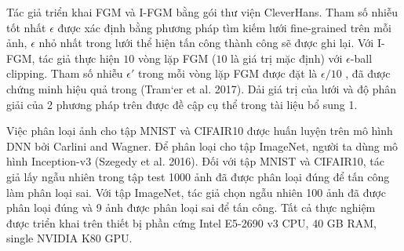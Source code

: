 Tác giả triển khai FGM và I-FGM bằng gói thư viện CleverHans. Tham số nhiễu tốt nhất $\epsilon$ được xác định bằng phương pháp tìm kiếm lưới fine-grained trên mỗi ảnh, $\epsilon$ nhỏ nhất trong lưới thể hiện tấn công thành công sẽ được ghi lại. Với I-FGM, tác giả thực hiện $10$ vòng lặp FGM ($10$ là giá trị mặc định) với $\epsilon$-ball clipping. Tham số nhiễu $\epsilon'$ trong mỗi vòng lặp FGM được đặt là $\epsilon/10$ , đã được chứng minh hiệu quả trong (Tram`er et al. 2017). Dải giá trị của lưới và độ phân giải của 2 phương pháp trên được đề cập cụ thể trong tài liệu bổ sung 1.

Việc phân loại ảnh cho tập MNIST và CIFAIR10 được huấn luyện trên mô hình DNN bởi Carlini and Wagner. Để phân loại cho tập ImageNet, người ta dùng mô hình Inception-v3 (Szegedy et al. 2016). Đối với tập MNIST và CIFAIR10, tác giả lấy ngẫu nhiên trong tập test 1000 ảnh đã được phân loại đúng để tấn công làm phân loại sai. Với tập ImageNet, tác giả chọn ngẫu nhiên 100 ảnh đã được phân loại đúng và 9 ảnh được phân loại sai để tấn công. Tất cả thực nghiệm được triển khai trên thiết bị phần cứng Intel E5-2690 v3 CPU, 40 GB RAM, single NVIDIA K80 GPU.